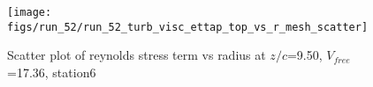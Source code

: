 \begin{figure}[H]
\centering
\texttt{[image: figs/run\_52/run\_52\_turb\_visc\_ettap\_top\_vs\_r\_mesh\_scatter]}
\caption{Scatter plot of reynolds stress term vs radius at $z/c$=9.50, $V_{free}$=17.36, station6}
\label{fig:run_52_turb_visc_ettap_top_vs_r_mesh_scatter}
\end{figure}


